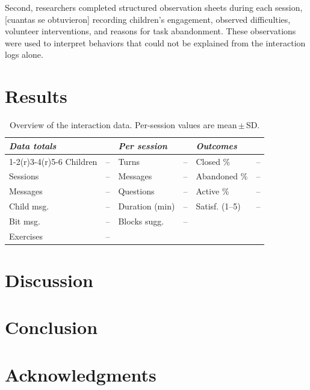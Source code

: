 \documentclass[fleqn,10pt]{JLA_article} %
\begin{document}
Second, researchers completed structured observation sheets during each
session, [cuantas se obtuvieron] recording children's engagement, observed difficulties, volunteer
interventions, and reasons for task abandonment. These observations were
used to interpret behaviors that could not be explained from the interaction logs alone.
\section{Results}
\begin{table}[ht]
\centering
\caption{Overview of the interaction data. Per-session values are mean\,$\pm$\,SD.}
\label{tab:corpus}
\footnotesize
\setlength{\tabcolsep}{4pt}
\begin{tabular}{lr@{\hskip 1.5em}lr@{\hskip 1.5em}lr}
\toprule
\multicolumn{2}{l}{\textit{Data totals}} &
\multicolumn{2}{l}{\textit{Per session}} &
\multicolumn{2}{l}{\textit{Outcomes}} \\
\cmidrule(r){1-2}\cmidrule(r){3-4}\cmidrule(r){5-6}
Children    & -- & Turns          & -- & Closed \%      & -- \\
Sessions    & -- & Messages       & -- & Abandoned \%   & -- \\
Messages    & -- & Questions      & -- & Active \%      & -- \\
Child msg.  & -- & Duration (min) & -- & Satisf. (1--5) & -- \\
Bit msg.    & -- & Blocks sugg.   & -- &                &    \\
Exercises   & -- &                &    &                &    \\
\bottomrule
\end{tabular}
\end{table}
\section{Discussion}

\section{Conclusion}
\section*{Acknowledgments} %


\printbibliography 

\end{document}
